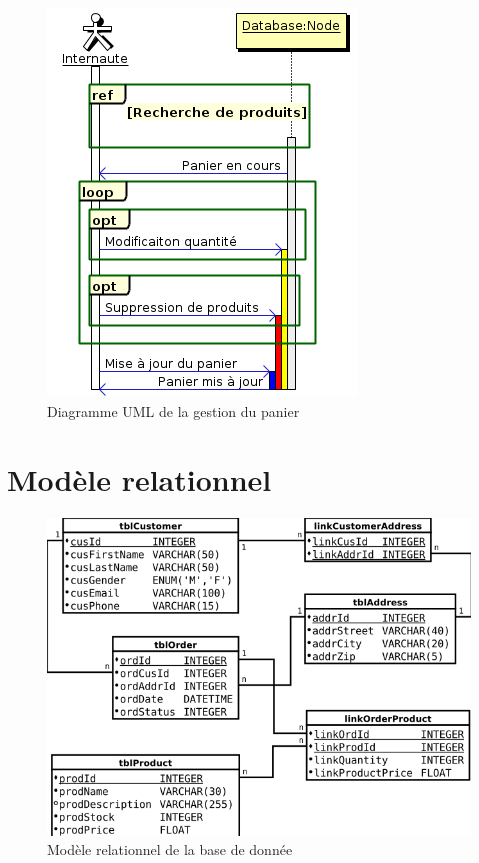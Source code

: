 \documentclass[12pt]{article}
\begin{document}
\begin{figure}[ht]
    \center
    \includegraphics[scale=0.7]{../Diagrams/SequenceDiagrams/panier.png}
    \caption*{Diagramme UML de la gestion du panier}
\end{figure}


\section{Modèle relationnel}

\begin{figure}[ht]
    \center
    \includegraphics[scale=0.7]{../Diagrams/ClassDiagrams/Database.png}
    \caption*{Modèle relationnel de la base de donnée}
\end{figure}
\end{document}
